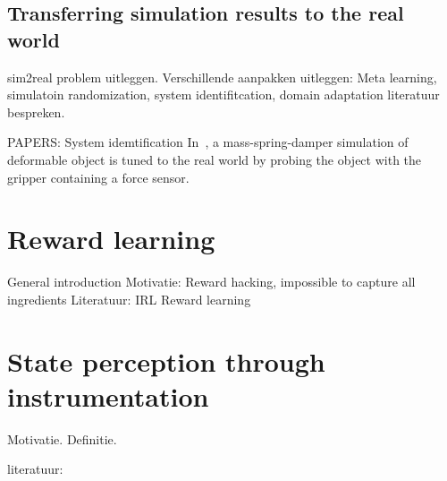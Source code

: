 \documentclass[\home/main.tex]{subfiles}
\begin{document}
\subsection{Transferring simulation results to the real world}  \label{sec:lit_sim2real}
sim2real problem uitleggen.
Verschillende aanpakken uitleggen: Meta learning, simulatoin randomization, system identifitcation, domain adaptation
literatuur bespreken. 

PAPERS:
	System idemtification
		In~\autocite{Howard2000}, a mass-spring-damper simulation of deformable object is tuned to the real world by probing the object with the gripper containing a force sensor. 

\section{Reward learning}  \label{sec:lit_reward_learning}
General introduction 
Motivatie: Reward hacking, impossible to capture all ingredients
Literatuur: 
	IRL 
	Reward learning 

\section{State perception through instrumentation} \label{sec:lit_instrumentation}
Motivatie.
Definitie.

literatuur:
\end{document}
